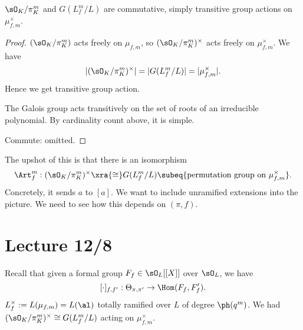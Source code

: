 \begin{cor}
$\sO_K/\pi_K^m$ and $G(L_f^m/L)$ are commutative, simply transitive group actions on $\mu^{\times}_{f,m}$.
\end{cor}
\begin{proof}
$(\sO_K/\pi_K^m)$ acts freely on $\mu_{f,m}$, so $(\sO_K/\pi_K^m)^{\times}$ acts freely on $\mu_{f,m}^{\times}$. We have
\[
|(\sO_K/\pi_K^m)^{\times}|=|G(L_f^m/L)|=|\mu_{f,m}^{\times}|.
\]
Hence we get transitive group action.

The Galois group acts transitively on the set of roots of an irreducible polynomial. %
By cardinality count above, it is simple.

Commute: omitted.
\end{proof}
The upshot of this is that there is an isomorphism
\[
\Art_f^m:(\sO_K/\pi_K^m)^{\times} \xra{\cong} G(L_f^m/L) \subeq \{\text{permutation group on }\mu_{f,m}^{\times}\}.
\]
Concretely, it sends $a$ to $[a]$. 
We want to include unramified extensions into the picture.
We need to see how this depends on $(\pi,f)$. 
\section{Lecture 12/8}
Recall that given a formal group $F_f\in \sO_L[[X]]$ over $\sO_L$, we have 
\[[\cdot]_{f,f'}:\Theta_{\pi,\pi'}\to \Hom(F_f,F_f').\]
$L_f^{\times}:=L(\mu_{f,m})=L(\al)$ totally ramified over $L$ of degree $\ph(q^m)$. We had $(\sO_K/\pi_K^m)^{\times}\cong G(L_f^m/L)$ acting on $\mu_{f,m}^{\times}$.

